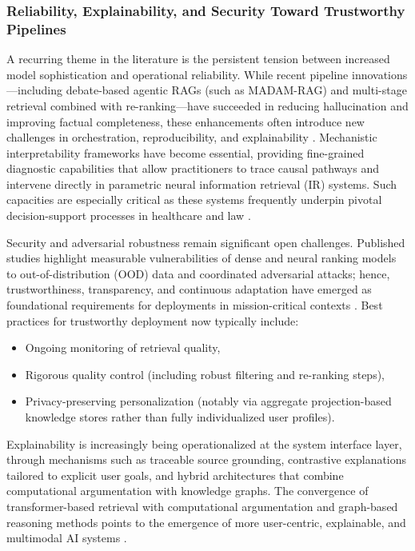 \documentclass[sigconf]{acmart}
\begin{document}
\subsubsection{Reliability, Explainability, and Security Toward Trustworthy Pipelines}

A recurring theme in the literature is the persistent tension between increased model sophistication and operational reliability. While recent pipeline innovations—including debate-based agentic RAGs (such as MADAM-RAG) and multi-stage retrieval combined with re-ranking—have succeeded in reducing hallucination and improving factual completeness, these enhancements often introduce new challenges in orchestration, reproducibility, and explainability \cite{ref2,ref3,ref5,ref21,ref28,ref39,ref46,ref50,ref55,ref61}. Mechanistic interpretability frameworks have become essential, providing fine-grained diagnostic capabilities that allow practitioners to trace causal pathways and intervene directly in parametric neural information retrieval (IR) systems. Such capacities are especially critical as these systems frequently underpin pivotal decision-support processes in healthcare and law \cite{ref33,ref34,ref53}.

Security and adversarial robustness remain significant open challenges. Published studies highlight measurable vulnerabilities of dense and neural ranking models to out-of-distribution (OOD) data and coordinated adversarial attacks; hence, trustworthiness, transparency, and continuous adaptation have emerged as foundational requirements for deployments in mission-critical contexts \cite{ref2,ref7,ref37,ref49,ref51,ref55,ref61,ref62}. Best practices for trustworthy deployment now typically include:
\begin{itemize}
  \item Ongoing monitoring of retrieval quality,
  \item Rigorous quality control (including robust filtering and re-ranking steps),
  \item Privacy-preserving personalization (notably via aggregate projection-based knowledge stores rather than fully individualized user profiles).
\end{itemize}
\cite{ref21,ref23,ref30,ref48}

Explainability is increasingly being operationalized at the system interface layer, through mechanisms such as traceable source grounding, contrastive explanations tailored to explicit user goals, and hybrid architectures that combine computational argumentation with knowledge graphs. The convergence of transformer-based retrieval with computational argumentation and graph-based reasoning methods points to the emergence of more user-centric, explainable, and multimodal AI systems \cite{ref17,ref24,ref29,ref36,ref37,ref39,ref40,ref43,ref54}.
\end{document}
